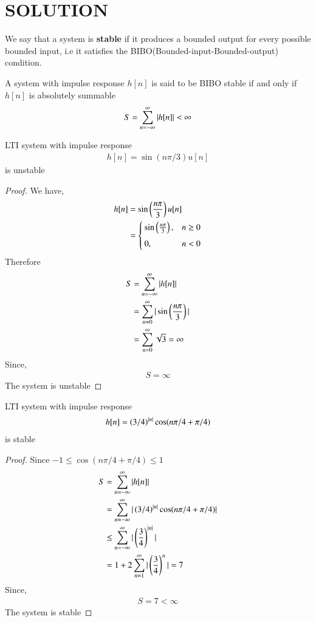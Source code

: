 \documentclass[journal,12pt,twocolumn]{IEEEtran}
\begin{document}
\section{SOLUTION}
%
\begin{definition}
We say that a system is \textbf{stable} if it produces a bounded output for every possible bounded input, i.e it satisfies the BIBO(Bounded-input-Bounded-output) condition.
\end{definition}
%
\begin{lemma}
A system with impulse response $h[n]$ is said to be BIBO stable if and only if $h[n]$ is absolutely summable
\begin{align}
    S = \sum_{n=-\infty}^{\infty}\vert h[n]\vert<\infty
\end{align}
\end{lemma}
\begin{lemma}
LTI system with impulse response 
\begin{align}
    h[n] = \sin(n\pi/3)u[n]
\end{align}
is unstable
\end{lemma}
\begin{proof}
We have,
\begin{align}
    h[n] &= \sin\left(\frac{n\pi}{3}\right)u[n]\\
         &= \begin{cases}
         \sin\left(\frac{n\pi}{3}\right), &  n \geq 0 \\~\\[-1em]
	     0, &  n<0 
         \end{cases}
\end{align}
Therefore
\begin{align}
    S &= \sum_{n=-\infty}^{\infty}\vert h[n]\vert\\ 
      &= \sum_{n=0}^{\infty} \vert\sin\left(\frac{n\pi}{3}\right)\vert\\
      &= \sum_{n=0}^{\infty} \sqrt{3}
      = \infty
\end{align}
Since, 
\begin{align}
    S = \infty 
\end{align}
The system is unstable
\end{proof}
\begin{lemma}
LTI system with impulse response 
\begin{align}
    h[n] =\left(3/4\right)^{\vert n\vert}\cos(n\pi/4 +\pi/4)
\end{align}
is stable
\end{lemma}
\begin{proof}
Since $-1\leq \cos(n\pi/4 +\pi/4)\leq 1$
\begin{align}
    S &= \sum_{n=-\infty}^{\infty}\vert h[n]\vert\\
    &= \sum_{n=-\infty}^{\infty}\vert\left(3/4\right)^{\vert n\vert}\cos(n\pi/4 +\pi/4)\vert\\
    &\leq \sum_{n=-\infty}^{\infty}\vert\left(\frac{3}{4}\right)^{\vert n\vert}\vert\\
    &=1+ 2\sum_{n=1}^{\infty}\vert\left(\frac{3}{4}\right)^{n}\vert
    = 7
\end{align}
Since,
\begin{align}
    S = 7 < \infty
\end{align}
The system is stable 
\end{proof}
\end{document}
